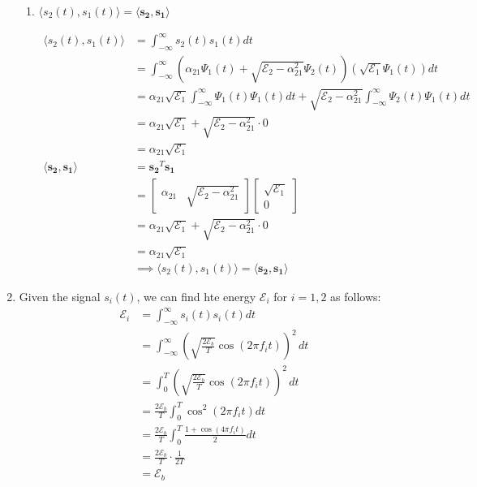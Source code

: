 \documentclass{article}
\begin{document}
\begin{enumerate}[label=2.\arabic*]
\begin{enumerate}[label=\alph*.]
        \item $\langle s_2(t), s_1(t) \rangle = \langle \mathbf{s_2}, \mathbf{s_1} \rangle$

        \begin{align*}
            \langle s_2(t), s_1(t) \rangle &= \int_{-\infty}^{\infty} s_2(t) s_1(t) dt \\
            &= \int_{-\infty}^{\infty} \left(\alpha_{21} \Psi_1(t) + \sqrt{\mathcal{E}_2 - \alpha_{21}^2}\Psi_2(t)\right)\left(\sqrt{\mathcal{E}_1}\Psi_1(t)\right) dt \\
            &= \alpha_{21}\sqrt{\mathcal{E}_1} \int_{-\infty}^{\infty} \Psi_1(t) \Psi_1(t) dt + \sqrt{\mathcal{E}_2 - \alpha_{21}^2}\int_{-\infty}^{\infty} \Psi_2(t) \Psi_1(t) dt \\
            &= \alpha_{21}\sqrt{\mathcal{E}_1} + \sqrt{\mathcal{E}_2 - \alpha_{21}^2} \cdot 0 \\
            &= \alpha_{21}\sqrt{\mathcal{E}_1} \\
            \langle \mathbf{s_2}, \mathbf{s_1} \rangle &= \mathbf{s_2}^T \mathbf{s_1} \\
            &= \begin{bmatrix}
                \alpha_{21} & \sqrt{\mathcal{E}_2 - \alpha_{21}^2}
            \end{bmatrix}
            \begin{bmatrix}
                \sqrt{\mathcal{E}_1} \\
                0
            \end{bmatrix} \\
            &= \alpha_{21}\sqrt{\mathcal{E}_1} + \sqrt{\mathcal{E}_2 - \alpha_{21}^2} \cdot 0 \\
            &= \alpha_{21}\sqrt{\mathcal{E}_1} \\
            &\implies \langle s_2(t), s_1(t) \rangle = \langle \mathbf{s_2}, \mathbf{s_1} \rangle
        \end{align*}
    \end{enumerate}

    \item Given the signal $s_i(t)$, we can find hte energy $\mathcal{E}_i$ for $i = 1, 2$ as follows:
    \begin{align*}
        \mathcal{E}_i &= \int_{-\infty}^{\infty} s_i(t) s_i(t) dt \\
        &= \int_{-\infty}^{\infty} \left(\sqrt{\frac{2\mathcal{E}_b}{T}}\cos\left(2\pi f_i t\right)\right)^2 \, dt \\
        &= \int_{0}^{T} \left(\sqrt{\frac{2\mathcal{E}_b}{T}}\cos\left(2\pi f_i t\right)\right)^2 \, dt \\
        &= \frac{2\mathcal{E}_b}{T} \int_{0}^{T} \cos^2\left(2\pi f_i t\right) dt \\
        &= \frac{2\mathcal{E}_b}{T} \int_{0}^{T} \frac{1+ \cos(4\pi f_i t)}{2} dt \\
        &= \frac{2\mathcal{E}_b}{T} \cdot \frac{1}{2T} \\
        &= \mathcal{E}_b 
    \end{align*}


\end{enumerate}
\end{document}
